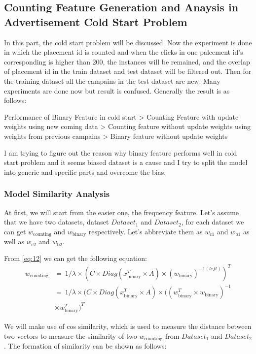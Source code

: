 \documentclass{sig-alternate}
\begin{document}
\subsection{Counting Feature Generation and Anaysis in Advertisement Cold Start Problem}
In this part, the cold start problem will be discussed. Now the experiment is done in which the placement id is counted and when the clicks in one palcement id's corresponding is higher than 200, the instances will be remained, and the overlap of placement id in the train dataset and test dataset will be filtered out. Then for the training dataset all the campains in the test dataset are new. Many experiments are done now but result is confused. Generally the result is as follows: 

Performance of Binary Feature in cold start > Counting Feature with update weights using new coming data > Counting feature without update weights using weights from previous campains > Binary feature without update weights


I am trying to figure out the reason why binary feature performs well in cold start problem and it seems biased dataset is a cause and I try to split the model into generic and specific parts and overcome the bias.
\subsubsection{Model Similarity Analysis}
At first, we will start from the easier one, the frequency feature. Let's assume that we have two datasets, dataset \(Dataset_{\text{1}}\) and \(Dataset_{\text{2}}\), for each dataset we can get \(w_{\text{counting}}\) and \(w_{\text{binary}}\) respectively. Let's abbreviate them as \(w_{\text{c1}}\) and \(w_{\text{b1}}\) as well as \(w_{\text{c2}}\) and \(w_{\text{b2}}\). 

From \ref{eq:12} we can get the following equation:
\begin{equation} \label{eq:28}
\begin{split}
w_{\text{counting}} & =\ 1/{\lambda} \times (C \times Diag(x_{\text{binary}}^T \times A) \times (w_{\text{binary}})^{-1(left)})^T \\
& = \ 1/{\lambda} \times (C \times Diag(x_{\text{binary}}^T \times A) \times ((w_{\text{binary}}^T \times w_{\text{binary}})^{-1} \\
& \times w_{\text{binary}}^T )^T
\end{split}
\end{equation}

We will make use of cos similarity, which is used to measure the distance between two vectors to measure the similarity of two \(w_{\text{counting}}\) from \(Dataset_{\text{1}}\) and \(Dataset_{\text{2}}\). The formation of similarity can be shown as follows:
\end{document}
